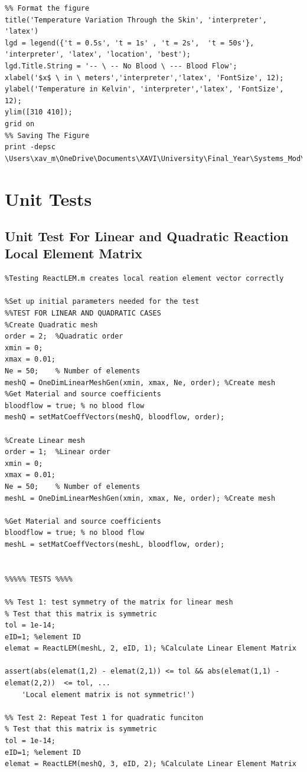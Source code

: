 \documentclass[11pt]{article}
\begin{document}
\begin{appendices}
\begin{lstlisting}
%% Format the figure
title('Temperature Variation Through the Skin', 'interpreter', 'latex')
lgd = legend({'t = 0.5s', 't = 1s' , 't = 2s',  't = 50s'}, 'interpreter', 'latex', 'location', 'best');
lgd.Title.String = '-- \ -- No Blood \ --- Blood Flow';
xlabel('$x$ \ in \ meters','interpreter','latex', 'FontSize', 12);
ylabel('Temperature in Kelvin', 'interpreter','latex', 'FontSize', 12);
ylim([310 410]);
grid on
%% Saving The Figure
print -depsc \Users\xav_m\OneDrive\Documents\XAVI\University\Final_Year\Systems_Mod\Modeling_CW2\Report\Figures\epsQ3Profiles

\end{lstlisting}
\pagebreak

\section{Unit Tests}
\subsection{Unit Test For Linear and Quadratic Reaction Local Element Matrix}
 \begin{lstlisting}
%Testing ReactLEM.m creates local reation element vector correctly

%Set up initial parameters needed for the test
%%TEST FOR LINEAR AND QUADRATIC CASES
%Create Quadratic mesh
order = 2;  %Quadratic order
xmin = 0;
xmax = 0.01;
Ne = 50;    % Number of elements
meshQ = OneDimLinearMeshGen(xmin, xmax, Ne, order); %Create mesh
%Get Material and source coefficients
bloodflow = true; % no blood flow
meshQ = setMatCoeffVectors(meshQ, bloodflow, order);

%Create Linear mesh
order = 1;  %Linear order
xmin = 0;
xmax = 0.01;
Ne = 50;    % Number of elements
meshL = OneDimLinearMeshGen(xmin, xmax, Ne, order); %Create mesh

%Get Material and source coefficients
bloodflow = true; % no blood flow
meshL = setMatCoeffVectors(meshL, bloodflow, order);


%%%%% TESTS %%%%    

%% Test 1: test symmetry of the matrix for linear mesh
% Test that this matrix is symmetric
tol = 1e-14;
eID=1; %element ID
elemat = ReactLEM(meshL, 2, eID, 1); %Calculate Linear Element Matrix

assert(abs(elemat(1,2) - elemat(2,1)) <= tol && abs(elemat(1,1) - elemat(2,2))  <= tol, ...
    'Local element matrix is not symmetric!')

%% Test 2: Repeat Test 1 for quadratic funciton
% Test that this matrix is symmetric
tol = 1e-14;
eID=1; %element ID
elemat = ReactLEM(meshQ, 3, eID, 2); %Calculate Linear Element Matrix


\end{lstlisting}
\end{appendices}
\end{document}
